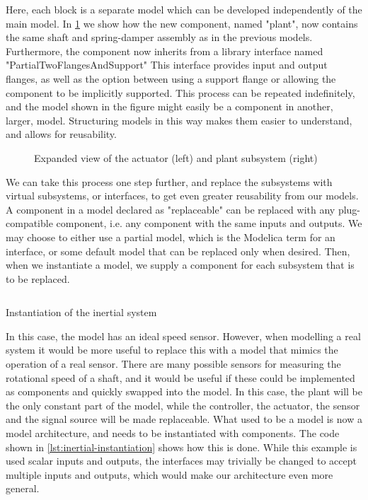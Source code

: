 \documentclass[\rootfolder/main.tex]{subfiles}
\begin{document}
Here, each block is a separate model which can be developed independently of the main model.
In \cref{fig:inertial-architecture-blowup} we show how the new component, named "plant", now contains the same shaft and spring-damper assembly as in the previous models.
Furthermore, the component now inherits from a library interface named "PartialTwoFlangesAndSupport"
This interface provides input and output flanges, as well as the option between using a support flange or allowing the component to be implicitly supported.
This process can be repeated indefinitely, and the model shown in the figure might easily be a component in another, larger, model.
Structuring models in this way makes them easier to understand, and allows for reusability.

\begin{figure}[ht]
        \caption{Expanded view of the actuator (left) and plant subsystem (right)}
	\label{fig:inertial-architecture-blowup}
\end{figure}

We can take this process one step further, and replace the subsystems with virtual subsystems, or interfaces, to get even greater reusability from our models.
A component in a model declared as "replaceable" can be replaced with any plug-compatible component, i.e. any component with the same inputs and outputs.
We may choose to either use a partial model, which is the Modelica term for an interface, or some default model that can be replaced only when desired.
Then, when we instantiate a model, we supply a component for each subsystem that is to be replaced.

\begin{listing}[ht]
    \inputminted[fontsize=\footnotesize]{Modelica}{\rootfolder/Models/MasterProject/Models/InertialImplementation.mo}
    \caption{Instantiation of the inertial system}
    \label{lst:inertial-instantiation}
\end{listing}

In this case, the model has an ideal speed sensor. However, when modelling a real system it would be more useful to replace this with a model that mimics the operation of a real sensor.
There are many possible sensors for measuring the rotational speed of a shaft, and it would be useful if these could be implemented as components and quickly swapped into the model.
In this case, the plant will be the only constant part of the model, while the controller, the actuator, the sensor and the signal source will be made replaceable.
What used to be a model is now a model architecture, and needs to be instantiated with components.
The code shown in \cref{lst:inertial-instantiation} shows how this is done.
While this example is used scalar inputs and outputs, the interfaces may trivially be changed to accept multiple inputs and outputs, which would make our architecture even more general.
\end{document}
